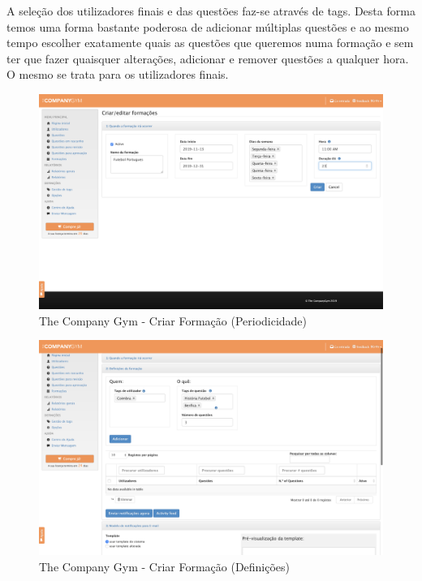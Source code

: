 A seleção dos utilizadores finais e das questões faz-se através de tags. Desta forma temos uma forma bastante poderosa de adicionar múltiplas questões e ao mesmo tempo escolher exatamente quais as questões que queremos numa formação e sem ter que fazer quaisquer alterações, adicionar e remover questões a qualquer hora. O mesmo se trata para os utilizadores finais. 



\begin{figure}[ht!]
	\begin{center}
		\includegraphics[width=1\textwidth]{img/tcg/tcg-form.png}
		\caption{The Company Gym - Criar Formação (Periodicidade)}
		\label{fig:tcg-form}
	\end{center}
\end{figure}

\newpage


\begin{figure}[ht!]
	\begin{center}
		\includegraphics[width=1\textwidth]{img/tcg/tcg-form1.png}
		\caption{The Company Gym - Criar Formação (Definições)}
		\label{fig:tcg-form1}
	\end{center}
\end{figure}


